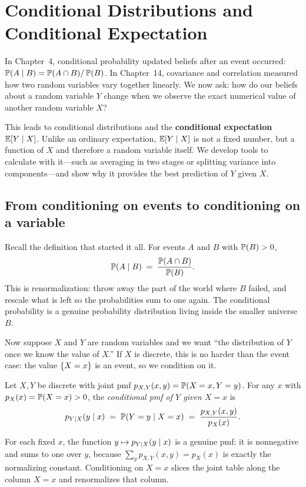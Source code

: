 \chapter{Conditional Distributions and Conditional Expectation}

In Chapter~4, conditional probability updated beliefs after an event occurred:
$\P(A \given B) = \P(A \cap B)/\P(B)$. In Chapter~14, covariance and correlation
measured how two random variables vary together linearly. We now ask: how do our beliefs about a random variable $Y$ change when we observe the
exact numerical value of another random variable $X$?

This leads to conditional distributions and the \textbf{conditional expectation}
$\E[Y \given X]$. Unlike an ordinary expectation, $\E[Y \given X]$ is not a fixed number, but a function
of $X$ and therefore a random variable itself. We develop tools to calculate with it---such as averaging in two stages or splitting variance into components---and show why
it provides the best prediction of $Y$ given $X$.

\section{From conditioning on events to conditioning on a variable}
\label{ch15:from-events}

Recall the definition that started it all. For events $A$ and $B$ with $\P(B) > 0$,
\[
  \P(A \given B) \;=\; \frac{\P(A \cap B)}{\P(B)}.
\]
This is renormalization: throw away the part of the world where $B$ failed, and rescale what is
left so the probabilities sum to one again. The conditional probability is a genuine probability
distribution living inside the smaller universe $B$.

Now suppose $X$ and $Y$ are random variables and we want ``the distribution of $Y$ once we know the
value of $X$.'' If $X$ is discrete, this is no harder than the event case: the value $\set{X = x}$ is
an event, so we condition on it.

\begin{definition}
\label{ch15:def-cond-pmf}
Let $X, Y$ be discrete with joint pmf $p_{X,Y}(x,y) = \P(X = x, Y = y)$. For any $x$ with
$p_X(x) = \P(X=x) > 0$, the \emph{conditional pmf of $Y$ given $X = x$} is
\[
  p_{Y \given X}(y \given x) \;=\; \P(Y = y \given X = x)
  \;=\; \frac{p_{X,Y}(x,y)}{p_X(x)}.
\]
\end{definition}

For each fixed $x$, the function $y \mapsto p_{Y \given X}(y \given x)$ is a genuine pmf: it is
nonnegative and sums to one over $y$, because $\sum_y p_{X,Y}(x,y) = p_X(x)$ is exactly the
normalizing constant. Conditioning on $X=x$ slices the joint table along the column $X=x$ and
renormalizes that column.

